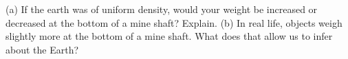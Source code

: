  (a) If the earth was of uniform density, would your
weight be increased or decreased at the bottom of a mine
shaft? Explain.\hwendpart
 (b) In real life, objects weigh slightly
more at the bottom of a mine shaft. What does that allow us
to infer about the Earth?
